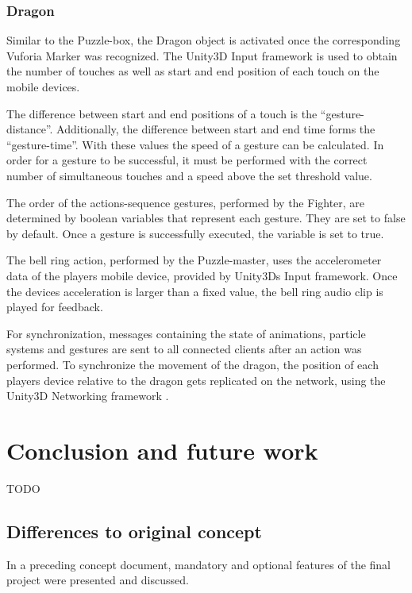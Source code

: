 \documentclass{sigchi-ext}
\begin{document}
\subsubsection{Dragon}

Similar to the Puzzle-box, the Dragon object is activated once the corresponding Vuforia Marker was recognized. The Unity3D Input framework is used to obtain the number of touches as well as start and end position of each touch on the mobile devices. 

The difference between start and end positions of a touch is the ``gesture-distance''. Additionally, the difference between start and end time forms the ``gesture-time''. With these values the speed of a gesture can be calculated. In order for a gesture to be successful, it must be performed with the correct number of simultaneous touches and a speed above the set threshold value.

The order of the actions-sequence gestures, performed by the Fighter, are determined by boolean variables that represent each gesture. They are set to false by default. Once a gesture is successfully executed, the variable is set to true.  

The bell ring action, performed by the Puzzle-master, uses the accelerometer data of the players mobile device, provided by Unity3Ds Input framework. Once the devices acceleration is larger than a fixed value, the bell ring audio clip is played for feedback. 

For synchronization, messages containing the state of animations, particle systems and gestures are sent to all connected clients after an action was performed. To synchronize the movement of the dragon, the position of each players device relative to the dragon gets replicated on the network, using the Unity3D Networking framework \cite{unityNetworkTransform}.

\section{Conclusion and future work}

TODO

\subsection{Differences to original concept}

In a preceding concept document, mandatory and optional features of the final project were presented and discussed.
\end{document}
